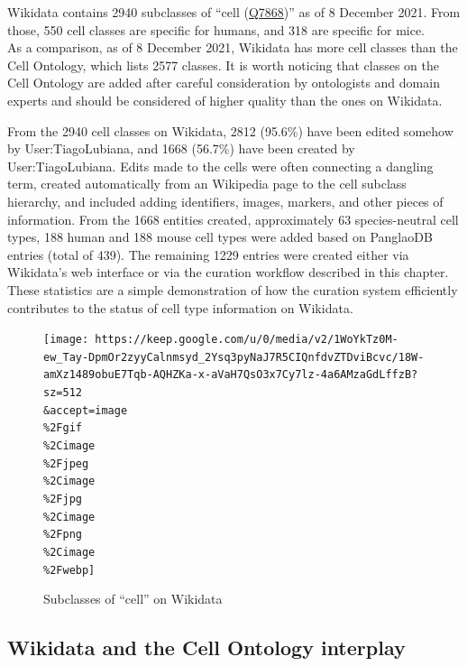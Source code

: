 Wikidata contains 2940 subclasses of ``cell (\href{https://www.wikidata.org/wiki/Q7868}{Q7868})'' as of 8 December 2021.
From those, 550 cell classes are specific for humans, and 318 are specific for mice.\\
As a comparison, as of 8 December 2021, Wikidata has more cell classes than the Cell Ontology, which lists 2577 classes.
It is worth noticing that classes on the Cell Ontology are added after careful consideration by ontologists and domain experts and should be considered of higher quality than the ones on Wikidata.

From the 2940 cell classes on Wikidata, 2812 (95.6\%) have been edited somehow by User:TiagoLubiana, and 1668 (56.7\%) have been created by User:TiagoLubiana.
Edits made to the cells were often connecting a dangling term, created automatically from an Wikipedia page to the cell subclass hierarchy, and included adding identifiers, images, markers, and other pieces of information.
From the 1668 entities created, approximately 63 species-neutral cell types, 188 human and 188 mouse cell types were added based on PanglaoDB entries (total of 439).
The remaining 1229 entries were created either via Wikidata's web interface or via the curation workflow described in this chapter.
These statistics are a simple demonstration of how the curation system efficiently contributes to the status of cell type information on Wikidata.

\begin{figure}
\hypertarget{fig:subclass_of_cell}{%
\centering
\texttt{[image: https://keep.google.com/u/0/media/v2/1WoYkTz0M-ew\_Tay-DpmOr2zyyCalnmsyd\_2Ysq3pyNaJ7R5CIQnfdvZTDviBcvc/18W-amXz1489obuE7Tqb-AQHZKa-x-aVaH7QsO3x7Cy7lz-4a6AMzaGdLffzB?sz=512\\\&accept=image\\\%2Fgif\\\%2Cimage\\\%2Fjpeg\\\%2Cimage\\\%2Fjpg\\\%2Cimage\\\%2Fpng\\\%2Cimage\\\%2Fwebp]}
\caption{Subclasses of ``cell'' on Wikidata}\label{fig:subclass_of_cell}
}
\end{figure}

\hypertarget{wikidata-and-the-cell-ontology-interplay}{%
\subsection{Wikidata and the Cell Ontology interplay}\label{wikidata-and-the-cell-ontology-interplay}}

